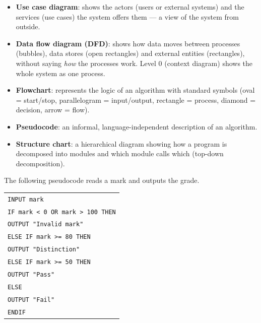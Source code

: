 \documentclass[11pt]{article}
\newcounter{popsec}
\newcounter{popsub}
\newcommand{\courssub}[1]{%
  \stepcounter{popsub}%
  \par\vspace{9pt}\noindent{\popxbold\fontsize{11.5}{13}\selectfont\color{popink}{\color{poporange}\thepopsec.\thepopsub}\hspace{6pt}#1}\par\nopagebreak\vspace{4pt}
}
\begin{document}
\begin{itemize}
\item \textbf{Use case diagram}: shows the actors (users or external systems) and the services (use cases) the system offers them — a view of the system from outside.
\item \textbf{Data flow diagram (DFD)}: shows how data moves between processes (bubbles), data stores (open rectangles) and external entities (rectangles), without saying \emph{how} the processes work. Level 0 (context diagram) shows the whole system as one process.
\item \textbf{Flowchart}: represents the logic of an algorithm with standard symbols (oval = start/stop, parallelogram = input/output, rectangle = process, diamond = decision, arrow = flow).
\item \textbf{Pseudocode}: an informal, language-independent description of an algorithm.
\item \textbf{Structure chart}: a hierarchical diagram showing how a program is decomposed into modules and which module calls which (top-down decomposition).
\end{itemize}

\begin{exemplebox}
The following pseudocode reads a mark and outputs the grade.
\begin{center}
\begin{tabular}{l}
\texttt{INPUT mark}\\
\texttt{IF mark < 0 OR mark > 100 THEN}\\
\hspace*{0.8cm}\texttt{OUTPUT "Invalid mark"}\\
\texttt{ELSE IF mark >= 80 THEN}\\
\hspace*{0.8cm}\texttt{OUTPUT "Distinction"}\\
\texttt{ELSE IF mark >= 50 THEN}\\
\hspace*{0.8cm}\texttt{OUTPUT "Pass"}\\
\texttt{ELSE}\\
\hspace*{0.8cm}\texttt{OUTPUT "Fail"}\\
\texttt{ENDIF}
\end{tabular}
\end{center}
\end{exemplebox}

\courssub{Testing}
\end{document}
